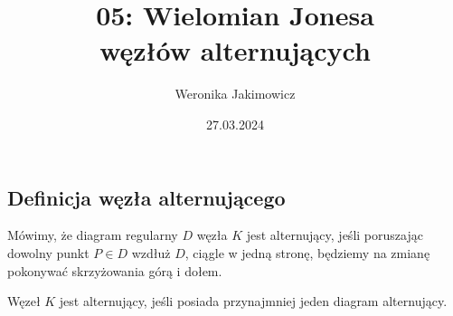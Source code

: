\documentclass{article}
\title{05: Wielomian Jonesa\\ węzłów alternujących}
\author{Weronika Jakimowicz}
\date{27.03.2024}
\begin{document}
\maketitle
\thispagestyle{empty}

\def\dupa{\textwidth - 4cm}


\tableofcontents\setcounter{page}{0}
\newpage 
\pagestyle{plain}

\subsection{Definicja węzła alternującego}

Mówimy, że diagram regularny $D$ węzła $K$ jest alternujący, jeśli poruszając dowolny punkt $P\in D$ wzdłuż $D$, ciągle w jedną stronę, będziemy na zmianę pokonywać skrzyżowania górą i dołem.

\begin{deff}
  Węzeł $K$ jest alternujący, jeśli posiada przynajmniej jeden diagram alternujący.
\end{deff}
\end{document}
